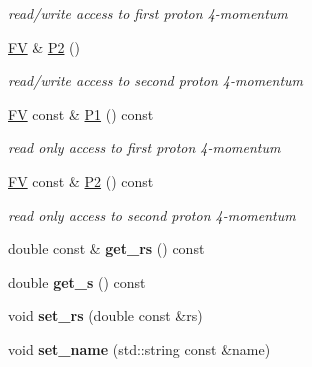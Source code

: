 \begin{DoxyCompactItemize}
\begin{DoxyCompactList}\small\item\em read/write access to first proton 4-\/momentum \end{DoxyCompactList}\item 
\hypertarget{classPS__2_a67fac165db2b49e4469787c6df78cb62}{\hyperlink{classFV}{F\-V} \& \hyperlink{classPS__2_a67fac165db2b49e4469787c6df78cb62}{P2} ()}\label{classPS__2_a67fac165db2b49e4469787c6df78cb62}

\begin{DoxyCompactList}\small\item\em read/write access to second proton 4-\/momentum \end{DoxyCompactList}\item 
\hypertarget{classPS__2_a772e6e3ed309f0afd1a4676b5cd2df92}{\hyperlink{classFV}{F\-V} const \& \hyperlink{classPS__2_a772e6e3ed309f0afd1a4676b5cd2df92}{P1} () const }\label{classPS__2_a772e6e3ed309f0afd1a4676b5cd2df92}

\begin{DoxyCompactList}\small\item\em read only access to first proton 4-\/momentum \end{DoxyCompactList}\item 
\hypertarget{classPS__2_aa9edfae86df81b545e27926fe7318e3e}{\hyperlink{classFV}{F\-V} const \& \hyperlink{classPS__2_aa9edfae86df81b545e27926fe7318e3e}{P2} () const }\label{classPS__2_aa9edfae86df81b545e27926fe7318e3e}

\begin{DoxyCompactList}\small\item\em read only access to second proton 4-\/momentum \end{DoxyCompactList}\item 
\hypertarget{classPS__2_a77b7be40d4f31c23a0bb0c112669c637}{double const \& {\bfseries get\-\_\-rs} () const }\label{classPS__2_a77b7be40d4f31c23a0bb0c112669c637}

\item 
\hypertarget{classPS__2_a3ef9ac96876f61f0c6a46a5321107bee}{double {\bfseries get\-\_\-s} () const }\label{classPS__2_a3ef9ac96876f61f0c6a46a5321107bee}

\item 
\hypertarget{classPS__2_a3b361fd3b41b8b92ab98e44dee130af8}{void {\bfseries set\-\_\-rs} (double const \&rs)}\label{classPS__2_a3b361fd3b41b8b92ab98e44dee130af8}

\item 
\hypertarget{classPS__2_a3dc6c6f095089139e641d1d4194dc09b}{void {\bfseries set\-\_\-name} (std\-::string const \&name)}\label{classPS__2_a3dc6c6f095089139e641d1d4194dc09b}


\end{DoxyCompactItemize}
